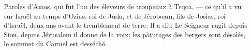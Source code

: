 Paroles d'Amos, qui fut l’un des éleveurs de troupeaux à Teqoa,
	--- ce qu’il a vu sur Israël au temps d’Ozias, roi de Juda,
	et de Jéroboam, fils de Josias, roi d’Israël, deux ans avant le tremblement de terre.
Il a dit: Le Seigneur rugit depuis Sion, depuis Jérusalem il donne de la voix;
	les pâturages des bergers sont désolés, le sommet du Carmel est desséché.
